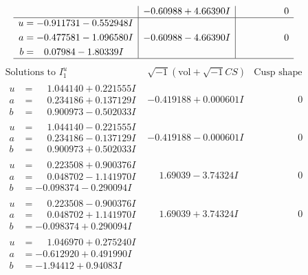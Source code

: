 \documentclass[1p]{elsarticle_modified}
\theoremstyle{definition}
\newcommand{\I}{\sqrt{-1}}
\begin{document}
$$\begin{array}{c|c|c}
 & -0.60988 + 4.66390 I & \phantom{-0.000000 } 0 \\ \hline\begin{aligned}
u &= -0.911731 - 0.552948 I \\
a &= -0.477581 - 1.096580 I \\
b &= \phantom{-}0.07984 - 1.80339 I\end{aligned}
 & -0.60988 - 4.66390 I & \phantom{-0.000000 } 0\\
 \hline 
 \end{array}$$\newpage$$\begin{array}{c|c|c}  
\text{Solutions to }I^u_{1}& \I (\text{vol} + \sqrt{-1}CS) & \text{Cusp shape}\\
 \hline 
\begin{aligned}
u &= \phantom{-}1.044140 + 0.221555 I \\
a &= \phantom{-}0.234186 + 0.137129 I \\
b &= \phantom{-}0.900973 - 0.502033 I\end{aligned}
 & -0.419188 + 0.000601 I & \phantom{-0.000000 } 0 \\ \hline\begin{aligned}
u &= \phantom{-}1.044140 - 0.221555 I \\
a &= \phantom{-}0.234186 - 0.137129 I \\
b &= \phantom{-}0.900973 + 0.502033 I\end{aligned}
 & -0.419188 - 0.000601 I & \phantom{-0.000000 } 0 \\ \hline\begin{aligned}
u &= \phantom{-}0.223508 + 0.900376 I \\
a &= \phantom{-}0.048702 - 1.141970 I \\
b &= -0.098374 - 0.290094 I\end{aligned}
 & \phantom{-}1.69039 - 3.74324 I & \phantom{-0.000000 } 0 \\ \hline\begin{aligned}
u &= \phantom{-}0.223508 - 0.900376 I \\
a &= \phantom{-}0.048702 + 1.141970 I \\
b &= -0.098374 + 0.290094 I\end{aligned}
 & \phantom{-}1.69039 + 3.74324 I & \phantom{-0.000000 } 0 \\ \hline\begin{aligned}
u &= \phantom{-}1.046970 + 0.275240 I \\
a &= -0.612920 + 0.491990 I \\
b &= -1.94412 + 0.94083 I\end{aligned}

\end{array}$$
\end{document}
